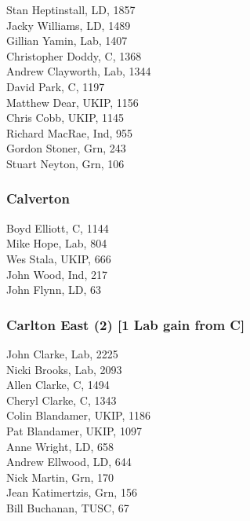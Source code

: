 \documentclass[a4paper,openany,10pt]{book}
\begin{document}


Stan Heptinstall, LD, 1857\\
Jacky Williams, LD, 1489\\
Gillian Yamin, Lab, 1407\\
Christopher Doddy, C, 1368\\
Andrew Clayworth, Lab, 1344\\
David Park, C, 1197\\
Matthew Dear, UKIP, 1156\\
Chris Cobb, UKIP, 1145\\
Richard MacRae, Ind, 955\\
Gordon Stoner, Grn, 243\\
Stuart Neyton, Grn, 106\\


\subsubsection*{Calverton}



Boyd Elliott, C, 1144\\
Mike Hope, Lab, 804\\
Wes Stala, UKIP, 666\\
John Wood, Ind, 217\\
John Flynn, LD, 63\\


\subsubsection*{Carlton East (2) \hspace*{\fill}\nolinebreak[1]%
\enspace\hspace*{\fill}
[1 Lab gain from C]}



John Clarke, Lab, 2225\\
Nicki Brooks, Lab, 2093\\
Allen Clarke, C, 1494\\
Cheryl Clarke, C, 1343\\
Colin Blandamer, UKIP, 1186\\
Pat Blandamer, UKIP, 1097\\
Anne Wright, LD, 658\\
Andrew Ellwood, LD, 644\\
Nick Martin, Grn, 170\\
Jean Katimertzis, Grn, 156\\
Bill Buchanan, TUSC, 67\\
\end{document}
